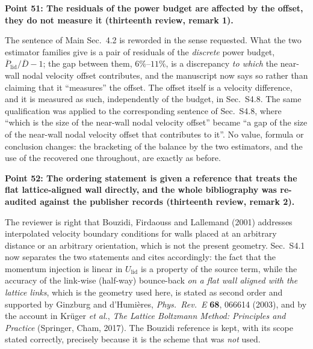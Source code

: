 \documentclass[11pt,a4paper]{article}
\begin{document}
\vspace{1em}

\noindent\textbf{Point 51: The residuals of the power budget are affected by the offset,
they do not measure it (thirteenth review, remark 1).}

The sentence of Main Sec.~4.2 is reworded in the sense requested. What the two
estimator families give is a pair of residuals of the \emph{discrete} power budget,
$\overline P_{\mathrm{lid}}/\overline D-1$; the gap between them, $6\%$--$11\%$, is a
discrepancy \emph{to which} the near-wall nodal velocity offset contributes, and the
manuscript now says so rather than claiming that it ``measures'' the offset. The
offset itself is a velocity difference, and it is measured as such, independently of
the budget, in Sec.~S4.8. The same qualification was applied to the corresponding
sentence of Sec.~S4.8, where ``which is the size of the near-wall nodal velocity
offset'' became ``a gap of the size of the near-wall nodal velocity offset that
contributes to it''. No value, formula or conclusion changes: the bracketing of the
balance by the two estimators, and the use of the recovered one throughout, are
exactly as before.

\vspace{1em}

\noindent\textbf{Point 52: The ordering statement is given a reference that treats the
flat lattice-aligned wall directly, and the whole bibliography was re-audited against
the publisher records (thirteenth review, remark 2).}

The reviewer is right that Bouzidi, Firdaouss and Lallemand (2001) addresses
interpolated velocity boundary conditions for walls placed at an arbitrary distance or
an arbitrary orientation, which is not the present geometry. Sec.~S4.1 now separates
the two statements and cites accordingly: the fact that the momentum injection is
linear in \(U_{\mathrm{lid}}\) is a property of the source term, while the accuracy of
the link-wise (half-way) bounce-back \emph{on a flat wall aligned with the lattice
links}, which is the geometry used here, is stated as second order and supported by
Ginzburg and d'Humi\`eres, \emph{Phys.\ Rev.\ E} \textbf{68}, 066614 (2003), and by the
account in Kr\"uger \emph{et al.}, \emph{The Lattice Boltzmann Method: Principles and
Practice} (Springer, Cham, 2017). The Bouzidi reference is kept, with its scope stated
correctly, precisely because it is the scheme that was \emph{not} used.
\end{document}

